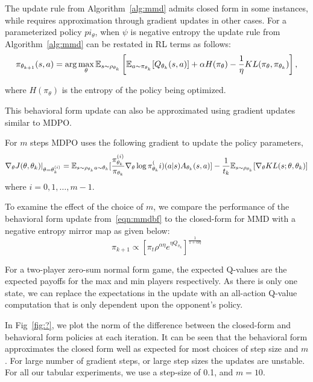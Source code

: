 The update rule from Algorithm~\ref{alg:mmd} admits closed form in some instances, while requires approximation 
through gradient updates in other cases.
For a parameterized policy $pi_\theta$, when $\psi$ is negative entropy the update rule from Algorithm~\ref{alg:mmd} can be restated in 
RL terms as follows:
\begin{equation}
	\label{eqn:mmdbf} \pi_{\theta_{k+1}}(s,a)
	= \arg \max_{\theta} \mathbb{E}_{s \sim \rho_{\theta_k}} \left[ \mathbb{E}_{a \sim \pi_{\theta_k}} [Q_{\theta_k}(s, a)] + \alpha H(\pi_\theta) - \frac{1}{\eta} KL(\pi_\theta, \pi_{\theta_k}) \right],
\end{equation}

where $H(\pi_\theta)$ is the entropy of the policy
being optimized.

This behavioral form update can also be approximated using gradient updates similar to MDPO. 

For $m$ steps MDPO uses the following gradient to update the policy parameters, 
\begin{equation}
	\label{eqn:mdpograd}
	\nabla_{\theta} J(\theta, \theta_k)|_{\theta = \theta_k^{(i)}} = \mathbb{E}_{s \sim \rho_{\theta_k} \\ a \sim \theta_k} 
	[\frac{\pi_{\theta_k}^{(i)}}{\pi_{\theta_k}} \nabla_{\theta} \log \pi_{\theta_k}^(i) (a|s) A_{\theta_k}(s,a)] - 
	\frac{1}{t_k} \mathbb{E}_{s \sim \rho_{\theta_k}} [\nabla_\theta KL(s; \theta, \theta_k)]
\end{equation}
where $i=0,1,\ldots,m-1$.

To examine the effect of the choice of $m$, we compare the performance of the behavioral form update from~\ref{eqn:mmdbf}  
to the closed-form for MMD with a negative entropy mirror map as given below:
$$\pi_{k+1} \propto [\pi_t \rho^{\alpha \eta} e^{\eta Q_{\pi_k}}]^{\frac{1}{1+\alpha \eta}}$$

For a two-player zero-sum normal form game, the expected Q-values are the expected payoffs for the max and min players respectively.
As there is only one state, we can replace the expectations in the update with an all-action Q-value computation that is only dependent 
upon the opponent's policy. 

In Fig~\ref{fig:?}, we plot the norm of the difference between the closed-form and behavioral form policies at each iteration. 
It can be seen that the behavioral form approximates the closed form well as expected for most choices of step size and $m$. 
For large number of gradient steps, or large step sizes the updates are unstable. 
For all our tabular experiments, we use a step-size of 0.1, and $m=10$.

